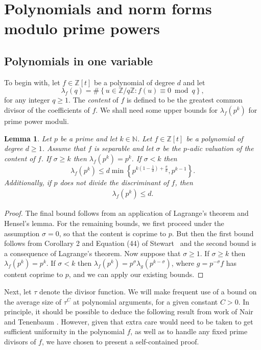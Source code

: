 \documentclass[11pt,letterpaper]{amsart}
\renewcommand{\leq}{\leqslant}
\renewcommand{\geq}{\geqslant}
\newtheorem{lemma}[theorem]{Lemma}
\theoremstyle{definition}
\numberwithin{equation}{section}
\newcommand\ZZ{\mathbb{Z}}
\newcommand\NN{\mathbb{N}}
\newcommand{\0}{\mathbf{0}}
\begin{document}
 
 
\section{Polynomials and norm forms modulo prime powers}\label{sec:polynomial}

\subsection{Polynomials in one variable}

To begin with, let $f\in \ZZ[t]$ be a polynomial of degree $d$ and let 
\begin{equation}\label{eq:lambda}
\lambda_f(q)=\#\left\{u\in \ZZ/q\ZZ: f(u)\equiv 0\bmod{q}\right\},
\end{equation}
for any integer $q\geq 1$. 
The {\em content} of $f$ is defined to be the greatest common divisor of the coefficients of $f$.
We shall need some upper bounds for $\lambda_f(p^k)$ for prime power moduli. 

\begin{lemma}\label{lem:stewart}
Let $p$ be a prime and let $k\in \NN$. Let $f\in \mathbb{Z}[t]$ be a polynomial of degree $d\geq 1$. Assume that $f$ is separable  and let $\sigma$ be the $p$-adic valuation of the  content of $f$. 
If $\sigma\geq k$ then $\lambda_f(p^k)=p^k$. If $\sigma<k$ then
$$
\lambda_f(p^k)\leq d \min\left\{p^{k(1-\frac{1}{d})+\frac{\sigma}{d}},  p^{k-1}\right\}.
$$
Additionally, if $p$ does not divide the discriminant of $f$, then
\begin{align*}
\lambda_f(p^k)\leq d.     
\end{align*}
\end{lemma}

\begin{proof}
The final bound follows  from an application of Lagrange's theorem and Hensel's lemma.
For the remaining bounds, we  first proceed under the assumption   $\sigma=0$, 
so that the content  is coprime to $p$. But then the first bound  follows from Corollary 2 and Equation (44) of Stewart~\cite{stewart} and  the second bound is a consequence of Lagrange's theorem. Now suppose that 
$\sigma\geq 1$. If $\sigma\geq k$ then $\lambda_f(p^k)=p^k$. If $\sigma<k$ then $\lambda_f(p^k)=p^{\sigma}\lambda_{g}(p^{k-\sigma})$, where $g=p^{-\sigma}f$ has content coprime to $p$, and we can apply our existing bounds. 
\end{proof}


Next, let $\tau$ denote the  divisor function.
We will make frequent use of a bound on the   average size of 
$\tau^C$ at polynomial arguments, for a given constant $C>0.$ In principle, it should be possible to deduce the following result from work of Nair and Tenenbaum \cite{NT}. However, given that 
extra care would need to be taken to get sufficient uniformity in the polynomial $f$, as well as  to 
handle any fixed prime divisors of $f$,  we have chosen to present a self-contained proof. 
\end{document}
